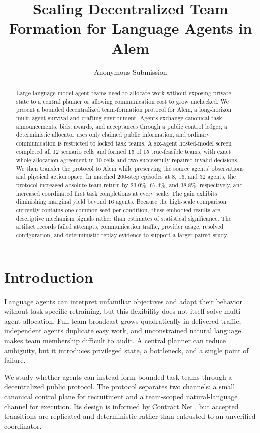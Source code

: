 \documentclass[letterpaper]{article} %
\title{Scaling Decentralized Team Formation for Language Agents in Alem}
\author{Anonymous Submission}
\begin{document}
\maketitle

\begin{abstract}
Large language-model agent teams need to allocate work without exposing private
state to a central planner or allowing communication cost to grow unchecked.
We present a bounded decentralized team-formation protocol for Alem, a
long-horizon multi-agent survival and crafting environment.  Agents exchange
canonical task announcements, bids, awards, and acceptances through a public
control ledger; a deterministic allocator uses only claimed public information,
and ordinary communication is restricted to locked task teams.  A six-agent
hosted-model screen completed all 12 scenario cells and formed 15 of 15
true-feasible teams, with exact whole-allocation agreement in 10 cells and two
successfully repaired invalid decisions.  We then transfer the protocol to
Alem while preserving the source agents' observations and physical action
space.  In matched 200-step episodes at 8, 16, and 32 agents, the protocol
increased absolute team return by 23.0\%, 67.4\%, and 38.8\%, respectively, and
increased coordinated first task completions at every scale.  The gain exhibits
diminishing marginal yield beyond 16 agents.  Because the high-scale comparison
currently contains one common seed per condition, these embodied results are
descriptive mechanism signals rather than estimates of statistical
significance.  The artifact records failed attempts, communication traffic,
provider usage, resolved configuration, and deterministic replay evidence to
support a larger paired study.
\end{abstract}

\section{Introduction}

Language agents can interpret unfamiliar objectives and adapt their behavior
without task-specific retraining, but this flexibility does not itself solve
multi-agent allocation.  Full-team broadcast grows quadratically in delivered
traffic, independent agents duplicate easy work, and unconstrained natural
language makes team membership difficult to audit.  A central planner can
reduce ambiguity, but it introduces privileged state, a bottleneck, and a
single point of failure.

We study whether agents can instead form bounded task teams through a
decentralized public protocol.  The protocol separates two channels: a small
canonical control plane for recruitment and a team-scoped natural-language
channel for execution.  Its design is informed by Contract Net
\citep{smith1980contractnet}, but accepted transitions are replicated and
deterministic rather than entrusted to an unverified coordinator.
\end{document}
